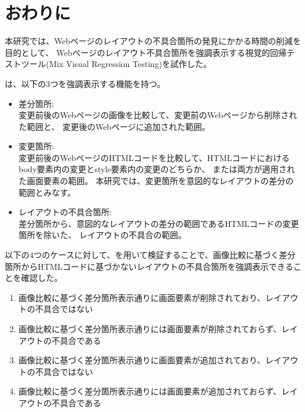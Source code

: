 \chapter{おわりに}\label{cha:Conclusion}
本研究では、Webページのレイアウトの不具合箇所の発見にかかる時間の削減を目的として、
Webページのレイアウト不具合箇所を強調表示する視覚的回帰テストツール\toolName(Mix Visual Regression Testing)を試作した。
\par
\toolName は、以下の3つを強調表示する機能を持つ。
\begin{itemize}
      \item 差分箇所:\\
            変更前後のWebページの画像を比較して、変更前のWebページから削除された範囲と、
            変更後のWebページに追加された範囲。
      \item 変更箇所:\\
            変更前後のWebページのHTMLコードを比較して、HTMLコードにおけるbody要素内の変更とstyle要素内の変更のどちらか、
            または両方が適用された画面要素の範囲。
            本研究では、変更箇所を意図的なレイアウトの差分の範囲とみなす。
      \item レイアウトの不具合箇所:\\
            差分箇所から、意図的なレイアウトの差分の範囲であるHTMLコードの変更箇所を除いた、
            レイアウトの不具合の範囲。
\end{itemize}
\par
以下の4つのケースに対して、\toolName を用いて検証することで、画像比較に基づく差分箇所からHTMLコードに基づかないレイアウトの不具合箇所を強調表示できることを確認した。
\begin{enumerate}[label=ケース\arabic*., leftmargin=1.8cm]
      \setlength{\itemsep}{0pt}
            \setlength{\parsep}{0pt}
      \item 画像比較に基づく差分箇所表示通りに画面要素が削除されており、レイアウトの不具合ではない
      \item 画像比較に基づく差分箇所表示通りには画面要素が削除されておらず、レイアウトの不具合である
      \item 画像比較に基づく差分箇所表示通りに画面要素が追加されており、レイアウトの不具合ではない
      \item 画像比較に基づく差分箇所表示通りには画面要素が追加されておらず、レイアウトの不具合である
\end{enumerate}
